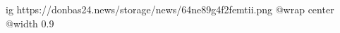 
 
 
 
 

\ifcmt
  ig https://donbas24.news/storage/news/64ne89g4f2femtii.png
  @wrap center
  @width 0.9
\fi
